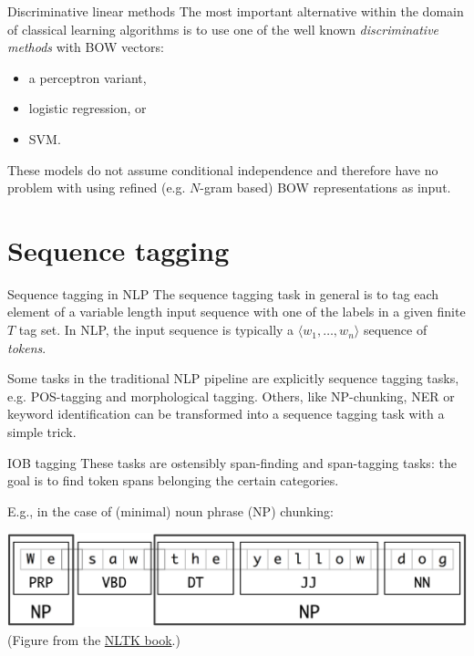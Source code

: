 \documentclass[style=upen, size=14pt]{powerdot}
\theoremstyle{definition}
\begin{document}
 \begin{slide}[toc=Discriminative methods]{Discriminative linear methods}
   The most important alternative within the domain of classical learning
   algorithms is to use one of the well known \emph{discriminative methods} with
   BOW vectors:
   \begin{itemize}
   \item a perceptron variant,
   \item logistic regression, or  
   \item SVM.
   \end{itemize}
   These models do not assume conditional independence and therefore have no
   problem with using refined (e.g. $N$-gram based) BOW representations as input.
 \end{slide}

 \section{Sequence tagging}

 \begin{slide}[toc=Tagging tasks in NLP]{Sequence tagging in NLP}
   The sequence tagging task in general is to tag each element of a variable
   length input sequence with one of the labels in a given finite $T$ tag set.
   In NLP, the input sequence is typically a $\langle w_1,\dots,w_n \rangle$
   sequence of \emph{tokens}.\bigskip

   Some tasks in the traditional NLP pipeline are explicitly sequence tagging
   tasks, e.g. POS-tagging and morphological tagging. Others, like NP-chunking,
   NER or keyword identification can be transformed into a sequence tagging task
   with a simple trick.
 \end{slide}

 \begin{slide}[toc=IOB tagging]{IOB tagging}
   These tasks are ostensibly span-finding and span-tagging tasks: the goal is
   to find token spans belonging the certain categories.

   E.g., in the case of (minimal) noun phrase (NP) chunking:
   \begin{center}
     \includegraphics[width=1.0\textwidth]{figures/iob1.eps}
   \footnotesize(Figure from the \href{http://www.nltk.org/book/ch07.html}{NLTK book}.)
 \end{center}
 \end{slide}
\end{document}

